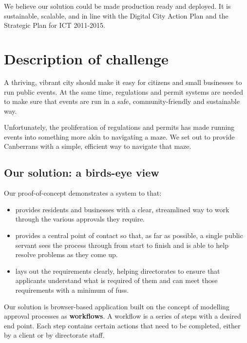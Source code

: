 \documentclass[12pt,a4paper,twosided]{article}
\begin{document}
We believe our solution could be made production ready and deployed. It
is sustainable, scalable, and in line with the Digital City Action Plan
and the Strategic Plan for ICT 2011-2015.

\newpage
\section{Description of challenge}

A thriving, vibrant city should make it easy for citizens and small
businesses to run public events. At the same time, regulations and
permit systems are needed to make sure that events are run in a safe,
community-friendly and sustainable way.

Unfortunately, the proliferation of regulations and permits has made
running events into something more akin to navigating a maze. We set out
to provide Canberrans with a simple, efficient way to navigate that
maze.

\subsection{Our solution: a birds-eye view}

Our proof-of-concept demonstrates a system to that:

\begin{itemize}

\item
  provides residents and businesses with a clear, streamlined way to
  work through the various approvals they require.
\item
  provides a central point of contact so that, as far as possible, a
  single public servant sees the process through from start to finish
  and is able to help resolve problems as they come up.
\item
  lays out the requirements clearly, helping directorates to ensure that
  applicants understand what is required of them and can meet those
  requirements with a minimum of fuss.
\end{itemize}

Our solution is browser-based application built on the concept of
modelling approval processes as \textbf{workflows}. A workflow is a
series of steps with a desired end point. Each step contains certain
actions that need to be completed, either by a client or by directorate
staff.
\end{document}
